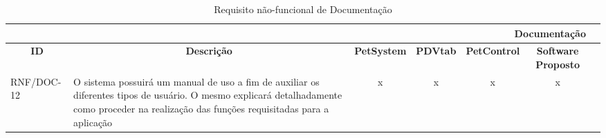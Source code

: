 \documentclass[12pt,openright,twoside,a4paper,english,french,spanish,brazil]{abntex2}
\begin{document}
\begin{landscape}
\begin{table}[!htpb]
\begin{small}
\begin{tabular}{|p{3cm}|p{}|c|c|c|cc|}
    \bottomrule
\end{tabular}%
\end{small}
\end{table}
\begin{table}[!htpb]
\centering
\caption{Requisito não-funcional de Documentação}\label{tab:RNF_DOC}
\begin{small} 
\setlength{\tabcolsep}{3pt}
\begin{tabular}{|p{3cm}|p{}|c|c|c|cc|}
\toprule
    \multicolumn{6}{r}{\textbf{Documentação}} \\
    \midrule
    \multicolumn{1}{c}{\textbf{ID}} & \multicolumn{1}{c}{\textbf{Descrição}} & \multicolumn{1}{c}{\textbf{PetSystem}} & \multicolumn{1}{c}{\textbf{PDVtab}} & \multicolumn{1}{c}{\textbf{PetControl}} & \multicolumn{1}{c}{\textbf{Software Proposto}} \\
    RNF/DOC-12 & O sistema possuirá um manual de uso a fim de auxiliar os diferentes tipos de usuário. O mesmo explicará detalhadamente como proceder na realização das funções requisitadas para a aplicação & x & x & x & x \\
    \bottomrule
\end{tabular}%
\end{small}
\end{table}
\end{landscape}
\newpage




%



\end{document}
